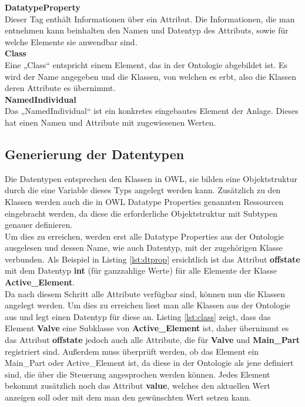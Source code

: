\textbf{DatatypeProperty}\\
Dieser Tag enthält Informationen über ein Attribut. Die Informationen, die man entnehmen kann beinhalten den Namen und Datentyp des Attributs, sowie für welche Elemente sie anwendbar sind.\\


\textbf{Class}\\
Eine „Class“ entspricht einem Element, das in der Ontologie abgebildet ist. Es wird der Name angegeben und die Klassen, von welchen es erbt, also die Klassen deren Attribute es übernimmt.\\


\textbf{NamedIndividual}\\
Das „NamedIndividual“ ist ein konkretes eingebautes Element der Anlage. Dieses hat einen Namen und Attribute mit zugewiesenen Werten.\\


\subsection{Generierung der Datentypen}
Die Datentypen entsprechen den Klassen in OWL, sie bilden eine Objektstruktur durch die eine Variable dieses Typs angelegt werden kann. Zusätzlich zu den Klassen werden auch die in OWL Datatype Properties genannten Ressourcen eingebracht werden, da diese die erforderliche Objektstruktur mit Subtypen genauer definieren.\\

Um dies zu erreichen, werden erst alle Datatype Properties aus der Ontologie ausgelesen und dessen Name, wie auch Datentyp, mit der zugehörigen Klasse verbunden. Als Beispiel in Listing \ref{lst:dtprop} ersichtlich ist das Attribut \textbf{offstate} mit dem Datentyp \textbf{int} (für ganzzahlige Werte) für alle Elemente der Klasse \textbf{Active\_Element}.\\

Da nach diesem Schritt alle Attribute verfügbar sind, können nun die Klassen angelegt werden. Um dies zu erreichen liest man alle Klassen aus der Ontologie aus und legt einen Datentyp für diese an. Listing \ref{lst:class} zeigt, dass das Element \textbf{Valve} eine Subklasse von \textbf{Active\_Element} ist, daher übernimmt es das Attribut \textbf{offstate} jedoch auch alle Attribute, die für \textbf{Valve} und \textbf{Main\_Part} registriert sind. Außerdem muss überprüft werden, ob das Element ein Main\_Part oder Active\_Element ist, da diese in der Ontologie als jene definiert sind, die über die Steuerung angesprochen werden können. Jedes Element bekommt zusätzlich noch das Attribut \textbf{value}, welches den aktuellen Wert anzeigen soll oder mit dem man den gewünschten Wert setzen kann.

